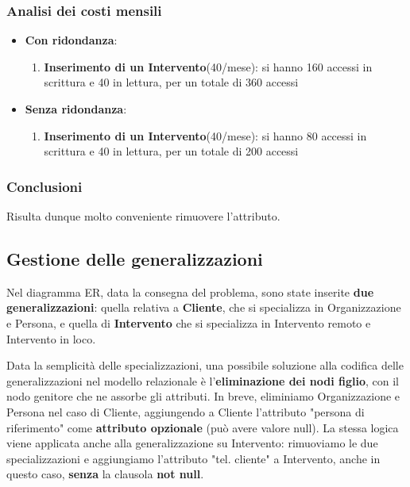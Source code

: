 \documentclass{article}
\begin{document}
\subsubsection{Analisi dei costi mensili}

\begin{itemize}
    \item \textbf{Con ridondanza}:
    \begin{enumerate}
        \item \textbf{Inserimento di un Intervento}(40/mese): si hanno 160 accessi in scrittura e 40 in lettura, per un totale di 360 accessi 
    \end{enumerate}
    \item \textbf{Senza ridondanza}:
    \begin{enumerate}
        \item \textbf{Inserimento di un Intervento}(40/mese): si hanno 80 accessi in scrittura e 40 in lettura, per un totale di 200 accessi 
    \end{enumerate}
\end{itemize}

\subsubsection{Conclusioni}

Risulta dunque molto conveniente rimuovere l'attributo.

\subsection{Gestione delle generalizzazioni}

Nel diagramma ER, data la consegna del problema, sono state inserite \textbf{due generalizzazioni}: quella relativa a \textbf{Cliente}, che si specializza in Organizzazione e Persona, e quella di \textbf{Intervento} che si specializza in Intervento remoto e Intervento in loco.

Data la semplicità delle specializzazioni, una possibile soluzione alla codifica delle generalizzazioni nel modello relazionale è l'\textbf{eliminazione dei nodi figlio}, con il nodo genitore che ne assorbe gli attributi. In breve, eliminiamo Organizzazione e Persona nel caso di Cliente, aggiungendo a Cliente l'attributo "persona di riferimento" come \textbf{attributo opzionale} (può avere valore null).
La stessa logica viene applicata anche alla generalizzazione su Intervento: rimuoviamo le due specializzazioni e aggiungiamo l'attributo "tel. cliente" a Intervento, anche in questo caso, \textbf{senza} la clausola \textbf{not null}.
\end{document}
